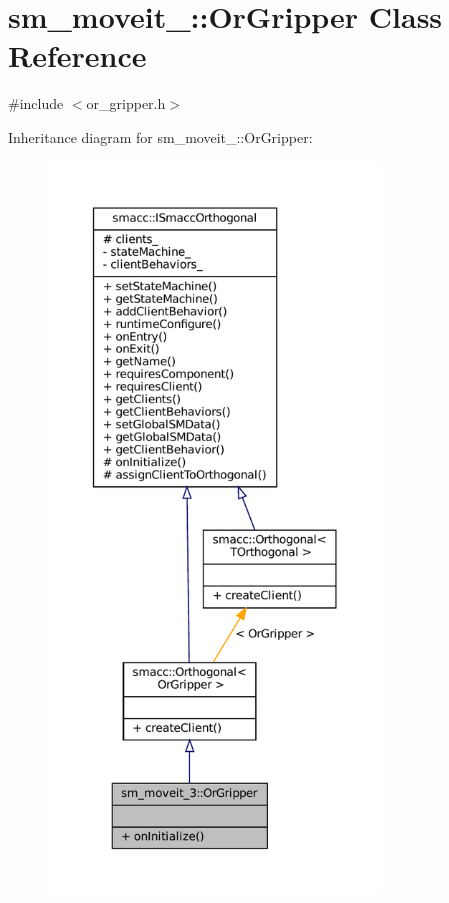 \hypertarget{classsm__moveit__3_1_1OrGripper}{}\section{sm\+\_\+moveit\+\_\+:\+:Or\+Gripper Class Reference}
\label{classsm__moveit__3_1_1OrGripper}


{\ttfamily \#include $<$or\+\_\+gripper.\+h$>$}



Inheritance diagram for sm\+\_\+moveit\+\_\+:\+:Or\+Gripper\+:
\nopagebreak
\begin{figure}[H]
\begin{center}
\leavevmode
\includegraphics[height=550pt]{classsm__moveit__3_1_1OrGripper__inherit__graph}
\end{center}
\end{figure}


